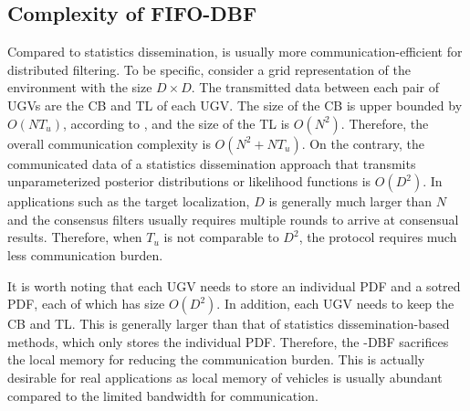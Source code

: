 	
	\subsection{Complexity of FIFO-DBF}
	Compared to statistics dissemination, {\proto} is usually more communication-efficient for distributed filtering. 
	To be specific, consider a grid representation of the environment with the size $D\times D$. %
	The transmitted data between each pair of UGVs are the CB and TL of each UGV.
	The size of the CB is upper bounded by $O(NT_u)$, according to , and the size of the TL is $O(N^2)$.
	Therefore, the overall communication complexity is $O(N^2+NT_u)$.	
	On the contrary, the communicated data of a statistics dissemination approach that transmits unparameterized posterior distributions or likelihood functions is $O(D^2)$.
	In applications such as the target localization, $D$ is generally much larger than $N$ and the consensus filters usually requires multiple rounds to arrive at consensual results.
	Therefore, when $T_u$ is not comparable to $D^2$, the {\proto} protocol requires much less communication burden.
	
	It is worth noting that each UGV needs to store an individual PDF and a sotred PDF, each of which has size $O(D^2)$. 
	In addition, each UGV needs to keep the CB and TL.
	This is generally larger than that of statistics dissemination-based methods, which only stores the individual PDF.
	Therefore, the \proto-DBF sacrifices the local memory for reducing the communication burden. 
	This is actually desirable for real applications as local memory of vehicles is usually abundant compared to the limited bandwidth for communication.
	
	
